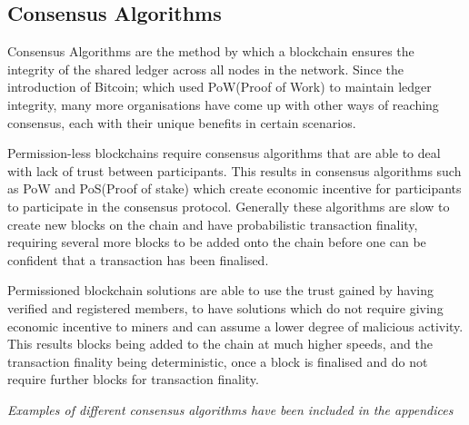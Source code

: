\subsection{Consensus Algorithms}

Consensus Algorithms are the method by which a blockchain ensures the integrity of the shared ledger across all nodes in the network. Since the introduction of Bitcoin; which used PoW(Proof of Work) to maintain ledger integrity, many more organisations have come up with other ways of reaching consensus, each with their unique benefits in certain scenarios. 

Permission-less blockchains require consensus algorithms that are able to deal with lack of trust between participants. This results in consensus algorithms such as PoW and PoS(Proof of stake) which create economic incentive for participants to participate in the consensus protocol\cite{buterin2014ethereum}. Generally these algorithms are slow to create new blocks on the chain and have probabilistic transaction finality, requiring several more blocks to be added onto the chain before one can be confident that a transaction has been finalised. 

Permissioned blockchain solutions are able to use the trust gained by having verified and registered members, to have solutions which do not require giving economic incentive to miners and can assume a lower degree of malicious activity. This results blocks being added to the chain at much higher speeds, and the transaction finality being deterministic, once a block is finalised and do not require further blocks for transaction finality.

\textit{Examples of different consensus algorithms have been included in the appendices}





